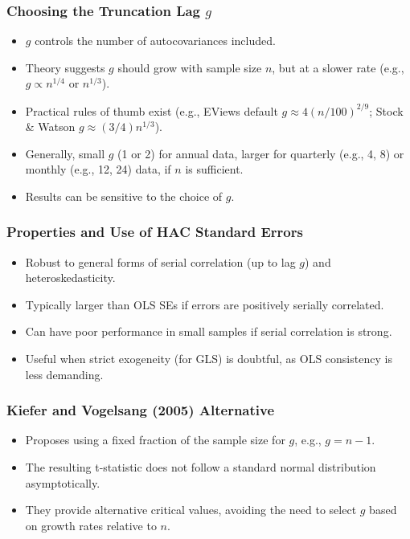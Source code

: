 \documentclass[a4paper, 10pt]{article}
\theoremstyle{definition}	%
\begin{document}
\subsubsection{Choosing the Truncation Lag \(g\)}
\begin{itemize}
    \item \(g\) controls the number of autocovariances included.
    \item Theory suggests \(g\) should grow with sample size \(n\), but at a slower rate (e.g., \(g \propto n^{1/4}\) or \(n^{1/3}\)).
    \item Practical rules of thumb exist (e.g., EViews default \(g \approx 4(n/100)^{2/9}\); Stock \& Watson \(g \approx (3/4)n^{1/3}\)).
    \item Generally, small \(g\) (1 or 2) for annual data, larger for quarterly (e.g., 4, 8) or monthly (e.g., 12, 24) data, if \(n\) is sufficient.
    \item Results can be sensitive to the choice of \(g\).
\end{itemize}

\subsubsection{Properties and Use of HAC Standard Errors}
\begin{itemize}
    \item Robust to general forms of serial correlation (up to lag \(g\)) and heteroskedasticity.
    \item Typically larger than OLS SEs if errors are positively serially correlated.
    \item Can have poor performance in small samples if serial correlation is strong.
    \item Useful when strict exogeneity (for GLS) is doubtful, as OLS consistency is less demanding.
\end{itemize}

\subsubsection{Kiefer and Vogelsang (2005) Alternative}
\begin{itemize}
    \item Proposes using a fixed fraction of the sample size for \(g\), e.g., \(g = n-1\).
    \item The resulting t-statistic does not follow a standard normal distribution asymptotically.
    \item They provide alternative critical values, avoiding the need to select \(g\) based on growth rates relative to \(n\).
\end{itemize}
\end{document}
